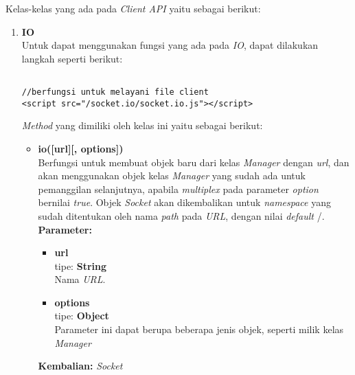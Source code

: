 Kelas-kelas yang ada pada \textit{Client API} yaitu sebagai berikut:
\begin{enumerate}
	\item \textbf{IO} \\
	Untuk dapat menggunakan fungsi yang ada pada \textit{IO}, dapat dilakukan langkah seperti berikut:
\begin{lstlisting}
	
//berfungsi untuk melayani file client
<script src="/socket.io/socket.io.js"></script>
\end{lstlisting}

	
	\textit{Method} yang dimiliki oleh kelas ini yaitu sebagai berikut:
	\begin{itemize}
		\item \textbf{io([url][, options])} \\
		Berfungsi untuk membuat objek baru dari kelas \textit{Manager} dengan \textit{url}, dan akan menggunakan objek kelas \textit{Manager} yang sudah ada untuk pemanggilan selanjutnya, apabila \textit{multiplex} pada parameter \textit{option} bernilai \textit{true}. Objek \textit{Socket} akan dikembalikan untuk \textit{namespace} yang sudah ditentukan oleh nama \textit{path} pada \textit{URL}, dengan nilai \textit{default} /. \\
		\textbf{Parameter:}
		\begin{itemize}
			\item \textbf{url} \\tipe: \textbf{String} \\ Nama \textit{URL}.
			\item \textbf{options} \\tipe: \textbf{Object} \\ Parameter ini dapat berupa beberapa jenis objek, seperti milik kelas \textit{Manager}
		\end{itemize}
		\textbf{Kembalian:} \textit{Socket}
		
	\end{itemize}
	

\end{enumerate}
